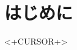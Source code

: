 \documentclass[10pt,a4paper,dvipdfmx]{jarticle}
\title{}
\author{IE5(32)福岡和弥}
\begin{document}
\maketitle

\section{はじめに}
<+CURSOR+>




\end{document}
